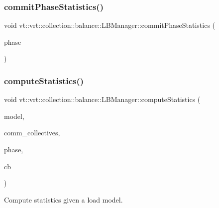 \subsubsection{\texorpdfstring{commit\+Phase\+Statistics()}{commitPhaseStatistics()}}
{\footnotesize\ttfamily void vt\+::vrt\+::collection\+::balance\+::\+L\+B\+Manager\+::commit\+Phase\+Statistics (\begin{DoxyParamCaption}\item[{\hyperlink{namespacevt_a46ce6733d5cdbd735d561b7b4029f6d7}{Phase\+Type}}]{phase }\end{DoxyParamCaption})}

\mbox{\label{structvt_1_1vrt_1_1collection_1_1balance_1_1_l_b_manager_a11affdf8bb17ff6d2906c7342285d6ec}} 
\subsubsection{\texorpdfstring{compute\+Statistics()}{computeStatistics()}}
{\footnotesize\ttfamily void vt\+::vrt\+::collection\+::balance\+::\+L\+B\+Manager\+::compute\+Statistics (\begin{DoxyParamCaption}\item[{std\+::shared\+\_\+ptr$<$ \hyperlink{structvt_1_1vrt_1_1collection_1_1balance_1_1_load_model}{Load\+Model} $>$}]{model,  }\item[{bool}]{comm\+\_\+collectives,  }\item[{\hyperlink{namespacevt_a46ce6733d5cdbd735d561b7b4029f6d7}{Phase\+Type}}]{phase,  }\item[{\hyperlink{namespacevt_a36db99df4c973d48b1118a293fff533f}{vt\+::\+Callback}$<$ \hyperlink{structvt_1_1vrt_1_1collection_1_1balance_1_1_l_b_manager_afedd89b1c2db43f087c1757db6200d36}{Stats\+Msg\+Type} $>$}]{cb }\end{DoxyParamCaption})}



Compute statistics given a load model. 


